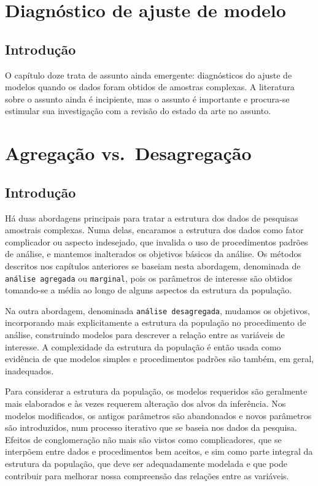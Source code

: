 \documentclass[]{book}
\theoremstyle{definition}
\theoremstyle{definition}
\theoremstyle{definition}
\theoremstyle{remark}
\begin{document}
\chapter{Diagnóstico de ajuste de
modelo}\label{diagnostico-de-ajuste-de-modelo}

\section{Introdução}\label{introducao-6}

O capítulo doze trata de assunto ainda emergente: diagnósticos do ajuste
de modelos quando os dados foram obtidos de amostras complexas. A
literatura sobre o assunto ainda é incipiente, mas o assunto é
importante e procura-se estimular sua investigação com a revisão do
estado da arte no assunto.

\chapter{Agregação vs.~Desagregação}\label{agregdesag}

\section{Introdução}\label{introducao-7}

Há duas abordagens principais para tratar a estrutura dos dados de
pesquisas amostrais complexas. Numa delas, encaramos a estrutura dos
dados como fator complicador ou aspecto indesejado, que invalida o uso
de procedimentos padrões de análise, e mantemos inalterados os objetivos
básicos da análise. Os métodos descritos nos capítulos anteriores se
baseiam nesta abordagem, denominada de \texttt{análise\ agregada} ou
\texttt{marginal}, pois os parâmetros de interesse são obtidos
tomando-se a média ao longo de alguns aspectos da estrutura da
população.

Na outra abordagem, denominada \texttt{análise\ desagregada}, mudamos os
objetivos, incorporando mais explicitamente a estrutura da população no
procedimento de análise, construindo modelos para descrever a relação
entre as variáveis de interesse. A complexidade da estrutura da
população é então usada como evidência de que modelos simples e
procedimentos padrões são também, em geral, inadequados.

Para considerar a estrutura da população, os modelos requeridos são
geralmente mais elaborados e às vezes requerem alteração dos alvos da
inferência. Nos modelos modificados, os antigos parâmetros são
abandonados e novos parâmetros são introduzidos, num processo iterativo
que se baseia nos dados da pesquisa. Efeitos de conglomeração não mais
são vistos como complicadores, que se interpõem entre dados e
procedimentos bem aceitos, e sim como parte integral da estrutura da
população, que deve ser adequadamente modelada e que pode contribuir
para melhorar nossa compreensão das relações entre as variáveis.
\end{document}
